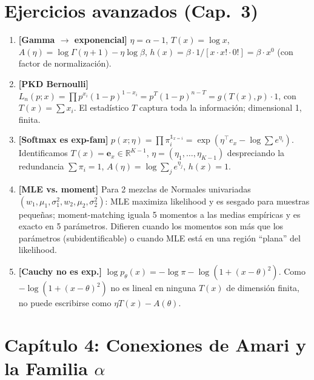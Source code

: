 \section*{Ejercicios avanzados (Cap.~3)}
\begin{enumerate}
	\item \textbf{[Gamma $\to$ exponencial]} $\eta=\alpha-1$, $T(x)=\log x$, $A(\eta)=\log\Gamma(\eta+1)-\eta\log\beta$, $h(x)=\beta\cdot 1/[x\cdot x!\cdot 0!]=\beta\cdot x^0$ (con factor de normalizaci\'on).
	\item \textbf{[PKD Bernoulli]} $L_n(p;x)=\prod p^{x_i}(1-p)^{1-x_i}=p^T(1-p)^{n-T}=g(T(x),p)\cdot 1$, con $T(x)=\sum x_i$. El estad\'istico $T$ captura toda la informaci\'on; dimensional 1, finita.
	\item \textbf{[Softmax es exp-fam]} $p(x;\eta)=\prod\pi_i^{\mathbb{1}_{x=i}}=\exp(\eta^\top e_x - \log\sum e^{\eta_i})$. Identificamos $T(x)=\mathbf{e}_x\in\mathbb{R}^{K-1}$, $\eta=(\eta_1,\dots,\eta_{K-1})$ despreciando la redundancia $\sum\pi_i=1$, $A(\eta)=\log\sum_je^{\eta_j}$, $h(x)=1$.
	\item \textbf{[MLE vs. moment]} Para 2 mezclas de Normales univariadas $(w_1,\mu_1,\sigma_1^2,w_2,\mu_2,\sigma_2^2)$: MLE maximiza likelihood y es sesgado para muestras peque\~nas; moment-matching iguala 5 momentos a las medias emp\'iricas y es exacto en 5 par\'ametros. Difieren cuando los momentos son m\'as que los par\'ametros (subidentificable) o cuando MLE est\'a en una regi\'on ``plana'' del likelihood.
	\item \textbf{[Cauchy no es exp.]} $\log p_\theta(x)=-\log\pi-\log(1+(x-\theta)^2)$. Como $-\log(1+(x-\theta)^2)$ no es lineal en ninguna $T(x)$ de dimensi\'on finita, no puede escribirse como $\eta T(x)-A(\theta)$.
\end{enumerate}

\section*{Capítulo 4: Conexiones de Amari y la Familia $\alpha$}

